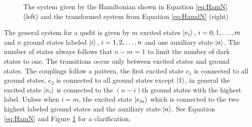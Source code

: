 \begin{figure}[H]
    \caption{The system given by the Hamiltonian shown in Equation \ref{eq:HamN} (left) and the transformed system from Equation \ref{eq:HamdN} (right)}
    \label{fig:HamN}
\end{figure}



The general system for a qudit is given by $m$ excited states $\ket{e_i},\,i = 0,1,\dots,m$ and $n$ ground states labeled $\ket{i},\,i = 1,2,\dots,n$ and one auxiliary state $\ket{a}$. The number of states always follows that $n-m = 1$ to limit the number of dark states to one\cite{lambda}.
The transitions occur only between excited states and ground states. The couplings follow a pattern, the first excited state $e_1$ is connected to all ground states, $e_2$ is connected to all ground states except $\ket{1}$, in general the excited state $\ket{e_i}$ is connected to the $(n - i)$th ground states with the highest label. Unless when $i = m$, the excited state $\ket{e_m}$ which is connected to the two highest labeled ground states and the auxiliary state $\ket{a}$. See Equation \ref{eq:HamN} and Figure \ref{fig:HamN} for a clarification. 

